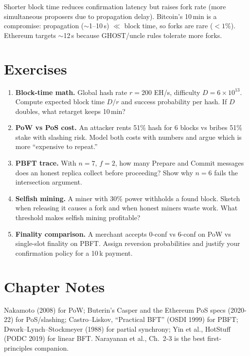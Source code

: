 \begin{remark}\label{rem:tenmin}
Shorter block time reduces confirmation latency but raises fork rate (more simultaneous proposers due to propagation delay). Bitcoin's 10\,min is a compromise: propagation ($\sim$1--10\,s) $\ll$ block time, so forks are rare ($<1\%$). Ethereum targets $\sim$12\,s because GHOST/uncle rules tolerate more forks.
\end{remark}

\section{Exercises}\label{sec:ch02-exercises}
\begin{enumerate}[label=E2.\arabic*, leftmargin=*, itemsep=0.6em]
    \item \textbf{Block-time math.} Global hash rate $r=200$ EH/s, difficulty $D=6\times10^{13}$. Compute expected block time $D/r$ and success probability per hash. If $D$ doubles, what retarget keeps 10\,min?
    \item \textbf{PoW vs PoS cost.} An attacker rents 51\% hash for 6 blocks vs bribes 51\% stake with slashing risk. Model both costs with numbers and argue which is more ``expensive to repeat.''
    \item \textbf{PBFT trace.} With $n=7$, $f=2$, how many Prepare and Commit messages does an honest replica collect before proceeding? Show why $n=6$ fails the intersection argument.
    \item \textbf{Selfish mining.} A miner with 30\% power withholds a found block. Sketch when releasing it causes a fork and when honest miners waste work. What threshold makes selfish mining profitable?
    \item \textbf{Finality comparison.} A merchant accepts 0-conf vs 6-conf on PoW vs single-slot finality on PBFT. Assign reversion probabilities and justify your confirmation policy for a 10\,k payment.
\end{enumerate}

\section*{Chapter Notes}
Nakamoto (2008) for PoW; Buterin's Casper and the Ethereum PoS specs (2020-22) for PoS/slashing; Castro--Liskov, ``Practical BFT'' (OSDI 1999) for PBFT; Dwork--Lynch--Stockmeyer (1988) for partial synchrony; Yin et al., HotStuff (PODC 2019) for linear BFT. Narayanan et al., Ch.~2-3 is the best first-principles companion.
